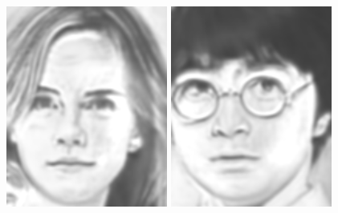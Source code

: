 \documentclass[10pt,twocolumn,letterpaper]{article}
\begin{document}
\begin{figure}[htbp]
{\begin{minipage}[b]{0.22\linewidth}
\includegraphics[width=0.99\linewidth]{img/real_world_photos/fcnn_r3.png}
\includegraphics[width=0.99\linewidth]{img/real_world_photos/fcnn_r4.png}

\end{minipage}}
\end{figure}
\end{document}
